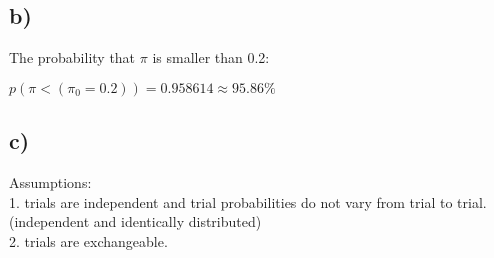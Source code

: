 \documentclass[article,11pt]{article}
\begin{document}
  \subsection*{b)}
  The probability that $\pi$ is smaller than 0.2:\\
  \begin{center}
  	$p(\pi<(\pi_{0}=0.2)) = 0.958614 \approx 95.86\%$
  \end{center}
  
  \subsection*{c)}
  Assumptions: \\
  1. trials are independent and trial probabilities do not vary from trial to trial. (independent and identically distributed)\\2. trials are exchangeable.
\end{document}
